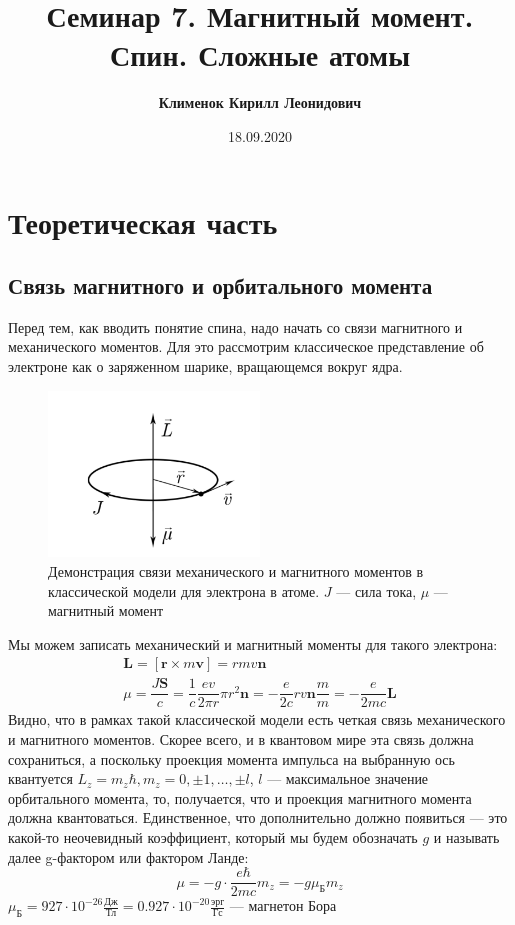 \documentclass[12pt]{article}
\begin{document}
 
\title{\textbf{Семинар 7. Магнитный момент. Спин. Сложные атомы}}
\author{\textbf{Клименок Кирилл Леонидович}}
\date{18.09.2020}
\maketitle
\section{Теоретическая часть}

\subsection{Связь магнитного и орбитального момента}
Перед тем, как вводить понятие спина, надо начать со связи магнитного и механического моментов. Для это рассмотрим классическое представление об электроне как о заряженном шарике, вращающемся вокруг ядра. 
\begin{figure}[h]
    \centering
    \includegraphics[width=0.5\textwidth,height=\textheight,keepaspectratio]{Seminar_07/pics/pic_01.PNG}
    \caption{Демонстрация связи механического и магнитного моментов в классической модели для электрона в атоме. $J$ --- сила тока, $\mu$ --- магнитный момент}
    \label{fig:sem_7_gymagnetic_ratio}
\end{figure}
Мы можем записать механический и магнитный моменты для такого электрона:
\begin{gather*}
    \textbf{L} = [\textbf{r} \times m\textbf{v}] = rmv \textbf{n}\\
    \mu = \dfrac{J\textbf{S}}{c} = \dfrac{1}{c} \dfrac{ev}{2\pi r}\pi r^2 \textbf{n} = - \dfrac{e}{2c} rv\textbf{n} \dfrac{m}{m} = -\dfrac{e}{2mc}\textbf{L}
\end{gather*}
Видно, что в рамках такой классической модели есть четкая связь механического и магнитного моментов. Скорее всего, и в квантовом мире эта связь должна сохраниться, а поскольку проекция момента импульса на выбранную ось квантуется $L_z = m_z \hbar, m_z = 0, \pm 1, \dots, \pm l$, $l$ --- максимальное значение орбитального момента, то, получается, что и проекция магнитного момента должна квантоваться. Единственное, что дополнительно должно появиться --- это какой-то неочевидный коэффициент, который мы будем обозначать $g$ и называть далее g-фактором или фактором Ланде:
\begin{equation}
\mu = -g\cdot \dfrac{e\hbar}{2mc} m_z = -g \mu_{\text{Б}} m_z   
\end{equation}
$\mu_{\text{Б}} = 927 \cdot 10^{-26} \frac{\text{Дж}}{\text{Тл}} = 0.927 \cdot 10^{-20} \frac{\text{эрг}}{\text{Гс}}$ --- магнетон Бора
\end{document}
